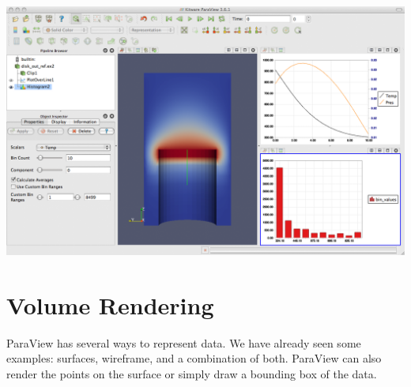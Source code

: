 \begin{inlinefig}
  \includegraphics[width=\scw]{images/HistogramPlot}
\end{inlinefig}


\section{Volume Rendering}

ParaView has several ways to represent data.  We have already seen some
examples: surfaces, wireframe, and a combination of both.  ParaView can
also render the points on the surface or simply draw a bounding box of the
data.

